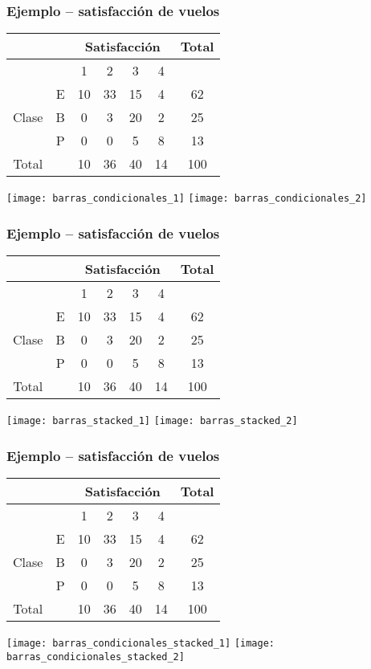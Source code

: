 \documentclass[table]{beamer}
\begin{document}
\begin{frame}
    \frametitle{Ejemplo -- satisfacción de vuelos}
    \begin{center}
        \begin{tabular}{c|c|cccc|c}
            & & \multicolumn{4}{c|}{Satisfacción} & Total \\
            \hline
            & & 1 & 2 & 3 & 4 & \\
            \hline
            & E & 10 & 33 & 15 & 4 & 62 \\
            Clase & B & 0 & 3 & 20 & 2 & 25 \\
            & P & 0 & 0 & 5 & 8 & 13 \\
            \hline
            Total & & 10 & 36 & 40 & 14 & 100
        \end{tabular}
        \texttt{[image: barras\_condicionales\_1]}
        \texttt{[image: barras\_condicionales\_2]}
    \end{center}
\end{frame}

\begin{frame}
    \frametitle{Ejemplo -- satisfacción de vuelos}
    \begin{center}
        \begin{tabular}{c|c|cccc|c}
            & & \multicolumn{4}{c|}{Satisfacción} & Total \\
            \hline
            & & 1 & 2 & 3 & 4 & \\
            \hline
            & E & 10 & 33 & 15 & 4 & 62 \\
            Clase & B & 0 & 3 & 20 & 2 & 25 \\
            & P & 0 & 0 & 5 & 8 & 13 \\
            \hline
            Total & & 10 & 36 & 40 & 14 & 100
        \end{tabular}
        \texttt{[image: barras\_stacked\_1]}
        \texttt{[image: barras\_stacked\_2]}
    \end{center}
\end{frame}

\begin{frame}
    \frametitle{Ejemplo -- satisfacción de vuelos}
    \begin{center}
        \begin{tabular}{c|c|cccc|c}
            & & \multicolumn{4}{c|}{Satisfacción} & Total \\
            \hline
            & & 1 & 2 & 3 & 4 & \\
            \hline
            & E & 10 & 33 & 15 & 4 & 62 \\
            Clase & B & 0 & 3 & 20 & 2 & 25 \\
            & P & 0 & 0 & 5 & 8 & 13 \\
            \hline
            Total & & 10 & 36 & 40 & 14 & 100
        \end{tabular}
        \texttt{[image: barras\_condicionales\_stacked\_1]}
        \texttt{[image: barras\_condicionales\_stacked\_2]}
    \end{center}
\end{frame}
\end{document}
